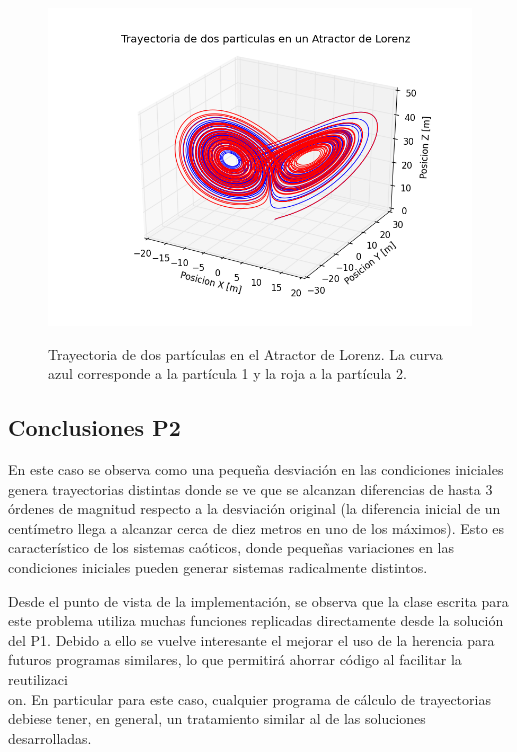 \documentclass{article}
\begin{document}
\begin{figure}[h]
  \centering
  \includegraphics[scale=0.6]{images/atractor_de_lorenz.png}
  \label{}
  \caption{Trayectoria de dos part\'iculas en el Atractor de Lorenz. La curva azul corresponde a la part\'icula 1 y la roja a la part\'icula 2.}
\end{figure}

\subsection{Conclusiones P2}

En este caso se observa como una peque\~na desviaci\'on en las condiciones iniciales genera trayectorias distintas donde se ve que se alcanzan diferencias de hasta 3 \'ordenes de magnitud respecto a la desviaci\'on original (la diferencia inicial de un cent\'imetro llega a alcanzar cerca de diez metros en uno de los m\'aximos). Esto es caracter\'istico de los sistemas ca\'oticos, donde peque\~nas variaciones en las condiciones iniciales pueden generar sistemas radicalmente distintos.

Desde el punto de vista de la implementaci\'on, se observa que la clase escrita para este problema utiliza muchas funciones replicadas directamente desde la soluci\'on del P1. Debido a ello se vuelve interesante el mejorar el uso de la herencia para futuros programas similares, lo que permitir\'a ahorrar c\'odigo al facilitar la reutilizaci\\on. En particular para este caso, cualquier programa de c\'alculo de trayectorias debiese tener, en general, un tratamiento similar al de las soluciones desarrolladas.  
\end{document}
